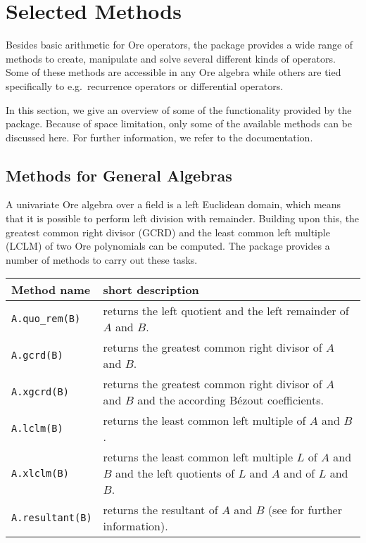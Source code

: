 \documentclass[11pt]{amsart}
\begin{document}
\section{Selected Methods}\label{sec:4}

Besides basic arithmetic for Ore operators, the package provides a wide range of
methods to create, manipulate and solve several different kinds of operators.
Some of these methods are accessible in any Ore algebra while others are tied
specifically to e.g.\ recurrence operators or differential operators. 

In this section, we give an overview of some of the functionality provided by
the package. Because of space limitation, only some of the available methods
can be discussed here. For further information, we refer to the documentation. 

\subsection{Methods for General Algebras}

A univariate Ore algebra over a field is a left Euclidean domain, which means
that it is possible to perform left division with remainder. Building upon this,
the greatest common right divisor (GCRD) and the least common left multiple
(LCLM) of two Ore polynomials can be computed. The package provides a number of
methods to carry out these tasks.

\begin{center}
  \begin{tabular}{|l|p{.65\hsize}|}
    \hline
    Method name & short description \\\hline
    \verb|A.quo_rem(B)| & returns the left quotient and the left remainder of $A$ and $B$.\\
    \verb|A.gcrd(B)| & returns the greatest common right divisor of $A$ and $B$.\\
    \verb|A.xgcrd(B)| & returns the greatest common right divisor of $A$ and $B$ and the according B\'ezout coefficients.\\
    \verb|A.lclm(B)| & returns the least common left multiple of $A$ and $B$.\\
    \verb|A.xlclm(B)| & returns the least common left multiple $L$ of $A$ and $B$ and the left quotients of $L$ and $A$ and of $L$ and $B$.\\
    \verb|A.resultant(B)| & returns the resultant of $A$ and $B$ (see \cite{li96} for further information).\\
    \hline
  \end{tabular}
\end{center}
\end{document}
